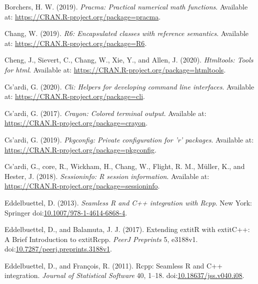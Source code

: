 \documentclass[utf8]{frontiersSCNS}
\newlength{\cslhangindent}
\newenvironment{cslreferences}%
  {\setlength{\parindent}{0pt}%
  \everypar{\setlength{\hangindent}{\cslhangindent}}\ignorespaces}%
  {\par}
\begin{document}
\begin{cslreferences}
\leavevmode\hypertarget{ref-borchers2019pracma}{}%
Borchers, H. W. (2019). \emph{Pracma: Practical numerical math
functions}. Available at:
\url{https://CRAN.R-project.org/package=pracma}.

\leavevmode\hypertarget{ref-chang2019encapsulated}{}%
Chang, W. (2019). \emph{R6: Encapsulated classes with reference
semantics}. Available at: \url{https://CRAN.R-project.org/package=R6}.

\leavevmode\hypertarget{ref-cheng2020htmltools}{}%
Cheng, J., Sievert, C., Chang, W., Xie, Y., and Allen, J. (2020).
\emph{Htmltools: Tools for html}. Available at:
\url{https://CRAN.R-project.org/package=htmltools}.

\leavevmode\hypertarget{ref-csrdi2020helpers}{}%
Cs\a'ardi, G. (2020). \emph{Cli: Helpers for developing command line
interfaces}. Available at: \url{https://CRAN.R-project.org/package=cli}.

\leavevmode\hypertarget{ref-csrdi2017crayon}{}%
Cs\a'ardi, G. (2017). \emph{Crayon: Colored terminal output}. Available
at: \url{https://CRAN.R-project.org/package=crayon}.

\leavevmode\hypertarget{ref-csrdi2019pkgconfig}{}%
Cs\a'ardi, G. (2019). \emph{Pkgconfig: Private configuration for 'r'
packages}. Available at:
\url{https://CRAN.R-project.org/package=pkgconfig}.

\leavevmode\hypertarget{ref-csrdi2018sessioninfo}{}%
Cs\a'ardi, G., core, R., Wickham, H., Chang, W., Flight, R. M., Müller,
K., and Hester, J. (2018). \emph{Sessioninfo: R session information}.
Available at: \url{https://CRAN.R-project.org/package=sessioninfo}.

\leavevmode\hypertarget{ref-eddelbuettel2013seamless}{}%
Eddelbuettel, D. (2013). \emph{Seamless R and C++ integration with
Rcpp}. New York: Springer
doi:\href{https://doi.org/10.1007/978-1-4614-6868-4}{10.1007/978-1-4614-6868-4}.

\leavevmode\hypertarget{ref-eddelbuettel2017extending}{}%
Eddelbuettel, D., and Balamuta, J. J. (2017). Extending extitR with
extitC++: A Brief Introduction to extitRcpp. \emph{PeerJ Preprints} 5,
e3188v1.
doi:\href{https://doi.org/10.7287/peerj.preprints.3188v1}{10.7287/peerj.preprints.3188v1}.

\leavevmode\hypertarget{ref-eddelbuettel2011rcpp}{}%
Eddelbuettel, D., and François, R. (2011). Rcpp: Seamless R and C++
integration. \emph{Journal of Statistical Software} 40, 1--18.
doi:\href{https://doi.org/10.18637/jss.v040.i08}{10.18637/jss.v040.i08}.


\end{cslreferences}
\end{document}
